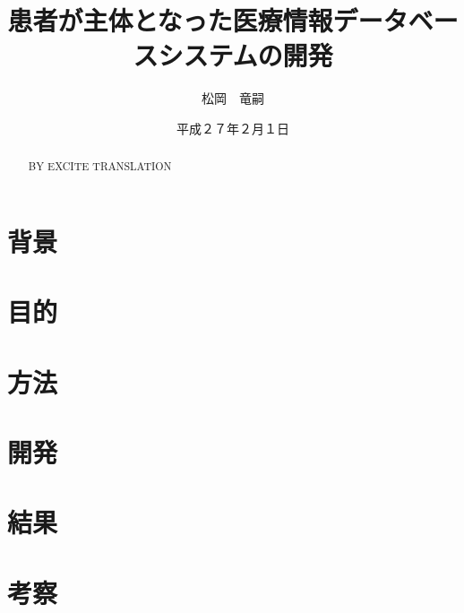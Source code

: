 \documentclass[12pt]{sotsuron}
\title{患者が主体となった医療情報データベースシステムの開発}
\author{松岡　竜嗣}
\date{平成２７年２月１日}
\affiliation{電子機械工学専攻}
\begin{document}
\maketitle
\begin{abstract}

BY EXCITE TRANSLATION
\end{abstract}

\tableofcontents
\clearpage

\section{背景}


\section{目的}


\section{方法}


\section{開発}


\section{結果}


\section{考察}



\appendix



\clearpage

\listoffigures
\clearpage

\listoftables
\clearpage
\end{document}
